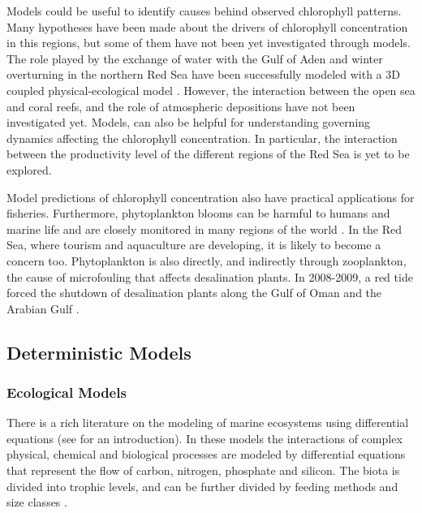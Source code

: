 Models could be useful to identify causes behind observed chlorophyll patterns.
Many hypotheses have been made about the drivers of chlorophyll concentration
in this regions, but some of them have not been yet investigated through
models. The role played by the exchange of water with the Gulf of Aden and
winter overturning in the northern Red Sea have been successfully modeled with
a 3D coupled physical-ecological model \citep{Yao2014, Yao2014b,
Triantafyllou2014}.  However, the interaction between the open sea and coral
reefs, and the role of atmospheric depositions have not been investigated yet.
Models, can also be helpful for understanding governing dynamics affecting the
chlorophyll concentration. In particular, the interaction between the
productivity level of the different regions of the Red Sea is yet to be
explored.

Model predictions of chlorophyll concentration also have practical applications
for fisheries. Furthermore, phytoplankton blooms can be harmful to humans and
marine life and are closely monitored in many regions of the world
\citep{Pettersson2013}. In the Red Sea, where tourism and aquaculture are
developing, it is likely to become a concern too. Phytoplankton is also
directly, and indirectly through zooplankton, the cause of microfouling that
affects desalination plants. In 2008-2009, a red tide forced the shutdown of
desalination plants along the Gulf of Oman and the Arabian Gulf
\citep{Richlen2010}.


\subsection{Deterministic Models}

\subsubsection{Ecological Models}

There is a rich literature on the modeling of marine ecosystems using
differential equations (see \citet{Fennel2004} for an introduction). In these
models the interactions of complex physical, chemical and biological processes
are modeled by differential equations that represent the flow of carbon,
nitrogen, phosphate and silicon. The biota is divided into trophic levels, and
can be further divided by feeding methods and size classes
\citep{Baretta1995, Triantafyllou2014}.

